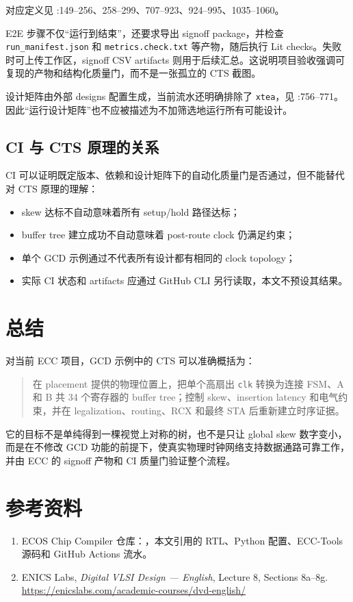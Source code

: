 \documentclass[UTF8,a4paper,11pt,fontset=fandol]{ctexart}
\newcommand{\code}[1]{\nolinkurl{#1}}
\begin{document}
对应定义见 :149--256、258--299、707--923、924--995、1035--1060。

E2E 步骤不仅“运行到结束”，还要求导出 signoff package，并检查 \code{run_manifest.json} 和 \code{metrics.check.txt} 等产物，随后执行 Lit checks。失败时可上传工作区，signoff CSV artifacts 则用于后续汇总。这说明项目验收强调可复现的产物和结构化质量门，而不是一张孤立的 CTS 截图。

设计矩阵由外部 designs 配置生成，当前流水还明确排除了 \code{xtea}，见 :756--771。因此“运行设计矩阵”也不应被描述为不加筛选地运行所有可能设计。

\subsection{CI 与 CTS 原理的关系}

CI 可以证明既定版本、依赖和设计矩阵下的自动化质量门是否通过，但不能替代对 CTS 原理的理解：
\begin{itemize}
  \item skew 达标不自动意味着所有 setup/hold 路径达标；
  \item buffer tree 建立成功不自动意味着 post-route clock 仍满足约束；
  \item 单个 GCD 示例通过不代表所有设计都有相同的 clock topology；
  \item 实际 CI 状态和 artifacts 应通过 GitHub CLI 另行读取，本文不预设其结果。
\end{itemize}

\section{总结}

对当前 ECC 项目，GCD 示例中的 CTS 可以准确概括为：
\begin{quote}
在 placement 提供的物理位置上，把单个高扇出 \code{clk} 转换为连接 FSM、A 和 B 共 34 个寄存器的 buffer tree；控制 skew、insertion latency 和电气约束，并在 legalization、routing、RCX 和最终 STA 后重新建立时序证据。
\end{quote}

它的目标不是单纯得到一棵视觉上对称的树，也不是只让 global skew 数字变小，而是在不修改 GCD 功能的前提下，使真实物理时钟网络支持数据通路可靠工作，并由 ECC 的 signoff 产物和 CI 质量门验证整个流程。

\section*{参考资料}
\begin{enumerate}
  \item ECOS Chip Compiler 仓库：，本文引用的 RTL、Python 配置、ECC-Tools 源码和 GitHub Actions 流水。
  \item ENICS Labs, \emph{Digital VLSI Design --- English}, Lecture 8, Sections 8a--8g.\\
  \url{https://enicslabs.com/academic-courses/dvd-english/}
\end{enumerate}
\end{document}
